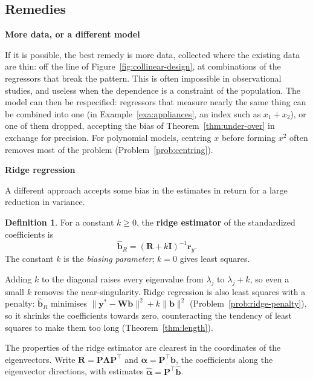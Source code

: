 \documentclass[11pt,a4paper]{article}
\numberwithin{equation}{section}
\theoremstyle{definition}
\newtheorem{defn}[thm]{Definition}
\newcommand{\subhead}[1]{%
  \par\medskip\noindent\textbf{#1}\par\nobreak\smallskip}
\begin{document}
\subsection{Remedies}
\subhead{More data, or a different model}
If it is possible, the best remedy is more data, collected where the existing data are thin: off the
line of Figure~\ref{fig:collinear-design}, at combinations of the regressors that break the pattern.
This is often impossible in observational studies, and useless when the dependence is a constraint of
the population. The model can then be respecified: regressors that measure nearly the same thing can be
combined into one (in Example~\ref{exa:appliances}, an index such as $x_1 + x_2$), or one of them dropped,
accepting the bias of Theorem~\ref{thm:under-over} in exchange for precision. For polynomial models,
centring $x$ before forming $x^2$ often removes most of the problem (Problem~\ref{prob:centring}).

\subhead{Ridge regression}
A different approach accepts some bias in the estimates in return for a large reduction in variance.

\begin{defn}
For a constant $k \ge 0$, the \textbf{ridge estimator} of the standardized coefficients is
\[
\hat{\mathbf{b}}_R = (\mathbf{R} + k\mathbf{I})^{-1}\mathbf{r}_y .
\]
The constant $k$ is the \emph{biasing parameter}; $k = 0$ gives least squares.
\end{defn}

Adding $k$ to the diagonal raises every eigenvalue from $\lambda_j$ to $\lambda_j + k$, so even a small $k$
removes the near-singularity. Ridge regression is also least squares with a penalty: $\hat{\mathbf{b}}_R$
minimises $\|\mathbf{y}^* - \mathbf{Wb}\|^2 + k\|\mathbf{b}\|^2$ (Problem~\ref{prob:ridge-penalty}), so it
shrinks the coefficients towards zero, counteracting the tendency of least squares to make them too
long (Theorem~\ref{thm:length}).

The properties of the ridge estimator are clearest in the coordinates of the eigenvectors. Write
$\mathbf{R} = \mathbf{P}\boldsymbol\Lambda\mathbf{P}^\top$ and $\boldsymbol\alpha = \mathbf{P}^\top\mathbf{b}$, the
coefficients along the eigenvector directions, with estimates $\hat{\boldsymbol\alpha} = \mathbf{P}^\top\hat{\mathbf{b}}$.
\end{document}
